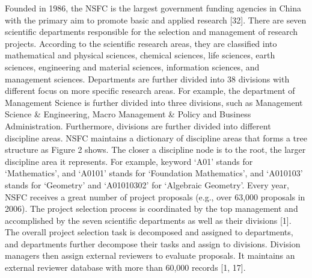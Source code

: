 \documentclass{elsarticle}
\begin{document}
Founded in 1986, the NSFC is the largest government funding agencies
in China with the primary aim to promote basic and applied research
[32]. There are seven scientific departments responsible for the
selection and management of research projects. According to the
scientific research areas, they are classified into mathematical and
physical sciences, chemical sciences, life sciences, earth sciences,
engineering and material sciences, information sciences, and
management sciences. Departments are further divided into 38 divisions
with different focus on more specific research areas. For example, the
department of Management Science is further divided into three
divisions, such as Management Science \& Engineering, Macro Management
\& Policy and Business Administration. Furthermore, divisions are
further divided into different discipline areas. NSFC maintains a
dictionary of discipline areas that forms a tree structure as Figure 2 shows. The closer a discipline node is to the root, the larger discipline area it represents. For example, keyword ‘A01’ stands for ‘Mathematics’, and ‘A0101’ stands for ‘Foundation Mathematics’, and ‘A010103’ stands for ‘Geometry’ and ‘A01010302’ for ‘Algebraic Geometry’. Every year, NSFC receives a great number of project proposals (e.g., over 63,000 proposals in 2006). The project selection process is coordinated by the top management and accomplished by the seven scientific departments as well as their divisions [1]. The overall project selection task is decomposed and assigned to departments, and departments further decompose their tasks and assign to divisions. Division managers then assign external reviewers to evaluate proposals. It maintains an external reviewer database with more than 60,000 records [1, 17].
\end{document}
